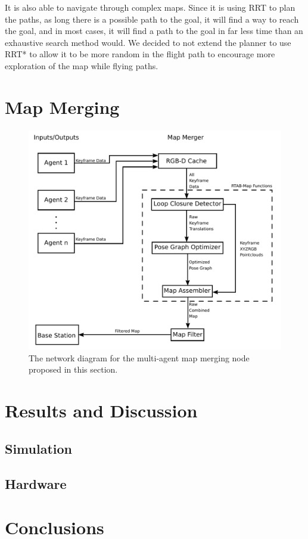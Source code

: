 \documentclass[letterpaper, 10 pt, conference]{ieeeconf}  %
\begin{document}
It is also able to navigate through complex maps. Since it is using RRT to plan the paths, as long there is a possible path to the goal, it will find a way to reach the goal, and in most cases, it will find a path to the goal in far less time than an exhaustive search method would. We decided to not extend the planner to use RRT* to allow it to be more random in the flight path to encourage more exploration of the map while flying paths.



\section{Map Merging}\label{merge}

\begin{figure}
\centering
\includegraphics[width=0.7\linewidth]{map_merger_network}
\caption{The network diagram for the multi-agent map merging node proposed in this section.}
\label{fig:map_merge}
\end{figure}
\section{Results and Discussion}\label{results}

\subsection{Simulation}

\subsection{Hardware}
\section{Conclusions}\label{conclusions}




\end{document}
